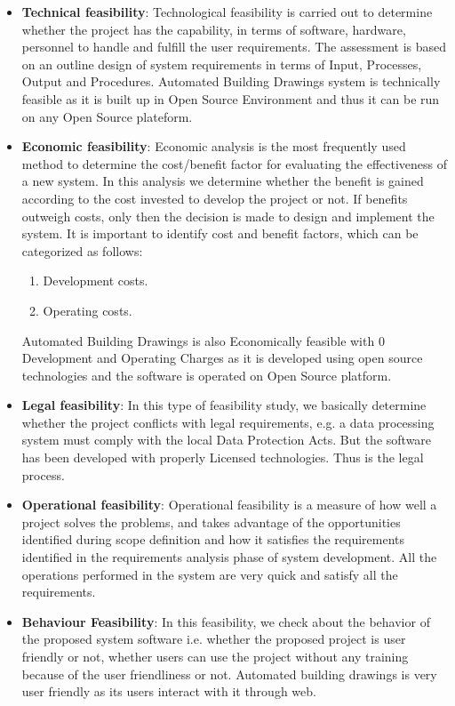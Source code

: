 \begin{itemize}
\item {\bf{Technical feasibility}}: Technological feasibility is carried 
out to determine whether the project has the capability, in terms of 
software, hardware, personnel to handle and fulfill the user 
requirements. The assessment is based on an outline design of system 
requirements in terms of Input, Processes, Output and Procedures. Automated Building Drawings system is technically feasible as it is built up in Open 
Source Environment and thus it can be run on any Open Source plateform.
\item {\bf{Economic feasibility}}: Economic analysis is the most 
frequently used method to determine the cost/benefit factor for 
evaluating the effectiveness of a new system. In this analysis we 
determine whether the benefit is gained according to the cost invested 
to develop the project or not. If benefits outweigh costs, only then 
the decision is made to design and implement the system. It is 
important to identify cost and benefit factors, which can be categorized 
as follows:
\begin{enumerate}
\item Development costs.
\item Operating costs.
\end{enumerate}
Automated Building Drawings is also Economically feasible with 0 Development 
and Operating Charges as it is developed using open source technologies and the software is operated on Open 
Source platform.
\item {\bf {Legal feasibility}}: In this type of feasibility study, we 
basically determine whether the project conflicts with legal 
requirements, e.g. a data processing system must comply with the local 
Data Protection Acts. But the software has been developed with properly Licensed technologies. 
Thus is the legal process.
\item {\bf{Operational feasibility}}: Operational feasibility is a measure 
of how well a project solves the problems, and takes advantage of the 
opportunities identified during scope definition and how it satisfies 
the requirements identified in the requirements analysis phase of system 
development. All the operations performed in the system are very quick 
and satisfy all the requirements.
\item {\bf{Behaviour Feasibility}}: In this feasibility, we check about the 
behavior of the proposed system software i.e. whether the proposed 
project is user friendly or not, whether users can use the project 
without any training because of the user friendliness or not. Automated building drawings is very user friendly as its users interact with it 
through web.
\end{itemize}

